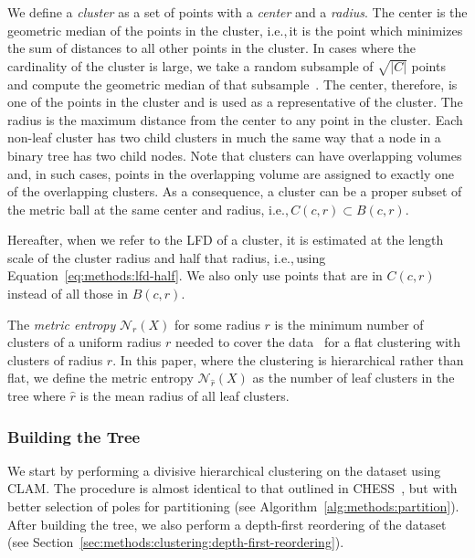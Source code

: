 We define a \textit{cluster} as a set of points with a \textit{center} and a \textit{radius}.
The center is the geometric median of the points in the cluster, i.e.,\,it is the point which minimizes the sum of distances to all other points in the cluster.
In cases where the cardinality of the cluster is large, we take a random subsample of $\sqrt{|C|}$ points and compute the geometric median of that subsample~\cite{ishaq2019clustered}.
The center, therefore, is one of the points in the cluster and is used as a representative of the cluster.
The radius is the maximum distance from the center to any point in the cluster.
Each non-leaf cluster has two child clusters in much the same way that a node in a binary tree has two child nodes.
Note that clusters can have overlapping volumes and, in such cases, points in the overlapping volume are assigned to exactly one of the overlapping clusters.
As a consequence, a cluster can be a proper subset of the metric ball at the same center and radius, i.e.,\,$C(c, r) \subset B(c, r)$.

Hereafter, when we refer to the LFD of a cluster, it is estimated at the length scale of the cluster radius and half that radius, i.e.,\,using Equation~\ref{eq:methods:lfd-half}.
We also only use points that are in $C(c, r)$ instead of all those in $B(c, r)$.

The \textit{metric entropy} $\mathcal{N}_{r}(X)$ for some radius $r$ is the minimum number of clusters of a uniform radius $r$ needed to cover the data~\cite{yu2015entropy} for a flat clustering with clusters of radius $r$.
In this paper, where the clustering is hierarchical rather than flat, we define the metric entropy $\mathcal{N}_{\hat{r}}(X)$ as the number of leaf clusters in the tree where $\hat{r}$ is the mean radius of all leaf clusters.


\subsubsection{Building the Tree}
\label{sec:methods:clustering:building-the-tree}

We start by performing a divisive hierarchical clustering on the dataset using CLAM.
The procedure is almost identical to that outlined in CHESS~\cite{ishaq2019clustered}, but with better selection of poles for partitioning (see Algorithm~\ref{alg:methods:partition}).
After building the tree, we also perform a depth-first reordering of the dataset (see Section~\ref{sec:methods:clustering:depth-first-reordering}).


